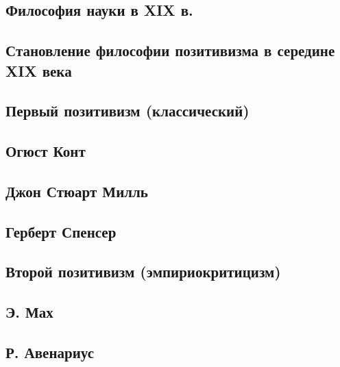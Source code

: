 \documentclass[main.tex]{subfiles}
\begin{document}

\subsection{Философия науки в XIX в.}


\subsection{Становление философии позитивизма в середине XIX века}


\subsection{Первый позитивизм (классический)}


\subsection{Огюст Конт}


\subsection{Джон Стюарт Милль}


\subsection{Герберт Спенсер}


\subsection{Второй позитивизм (эмпириокритицизм)}


\subsection{Э. Мах}


\subsection{Р. Авенариус}
\end{document}
